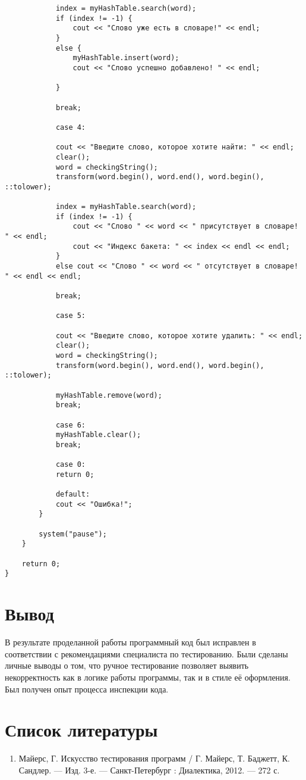 \documentclass[11pt,a4paper,final]{article} %
\begin{document}
\begin{lstlisting}
			index = myHashTable.search(word);
			if (index != -1) {
				cout << "Слово уже есть в словаре!" << endl;
			}
			else {
				myHashTable.insert(word);
				cout << "Слово успешно добавлено! " << endl;
				
			}
			
			break;
			
			case 4:
			
			cout << "Введите слово, которое хотите найти: " << endl;
			clear();
			word = checkingString();
			transform(word.begin(), word.end(), word.begin(), ::tolower);
			
			index = myHashTable.search(word);
			if (index != -1) {
				cout << "Слово " << word << " присутствует в словаре! " << endl;
				cout << "Индекс бакета: " << index << endl << endl;
			}
			else cout << "Слово " << word << " отсутствует в словаре! " << endl << endl;
			
			break;
			
			case 5:
			
			cout << "Введите слово, которое хотите удалить: " << endl;
			clear();
			word = checkingString();
			transform(word.begin(), word.end(), word.begin(), ::tolower);
			
			myHashTable.remove(word);
			break;
			
			case 6:
			myHashTable.clear();
			break;
			
			case 0:
			return 0;
			
			default:
			cout << "Ошибка!";
		}
		
		system("pause");
	}
	
	return 0;
}
\end{lstlisting}


\newpage
\section*{Вывод}

В результате проделанной работы программный код был исправлен в соответствии с рекомендациями специалиста по тестированию. Были сделаны личные выводы о том, что ручное тестирование позволяет выявить некорректность как в логике работы программы, так и в стиле её оформления. Был получен опыт процесса инспекции кода.

\newpage
\section*{Список литературы}

\begin{enumerate}
	\item Майерс, Г. Искусство тестирования программ / Г. Майерс, Т. Баджетт, К. Сандлер. — Изд. 3-е. — Санкт-Петербург : Диалектика, 2012. — 272 с.
\end{enumerate}
\end{document}
